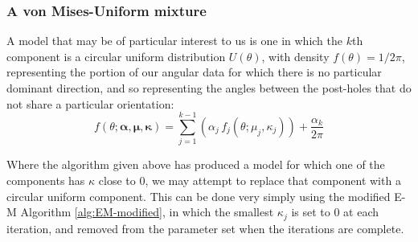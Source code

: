 \documentclass[../../ArchStats.tex]{subfiles}
\begin{document}
\subsubsection{A von Mises-Uniform mixture}
A model that may be of particular interest to us is one in which the $k$th component is a circular uniform distribution $U(\theta)$, with density $f(\theta) = 1/2\pi$, representing the portion of our angular data for which there is no particular dominant direction, and so representing the angles between the post-holes that do not share a particular orientation:
\begin{equation}
f(\theta; \boldsymbol{\alpha, \mu, \kappa}) = \sum_{j=1}^{k-1} \left(\alpha_j \, f_j(\theta; \mu_j, \kappa_j)\right) + \frac{\alpha_k}{2\pi}
\end{equation}


Where the algorithm given above has produced a model for which one of the components has $\kappa$ close to 0, we may attempt to replace that component with a circular uniform component. This can be done very simply using the modified E-M Algorithm \ref{alg:EM-modified}, in which the smallest $\kappa_j$ is set to 0 at each iteration, and removed from the parameter set when the iterations are complete. 
\end{document}

